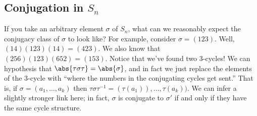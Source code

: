 \subsection{Conjugation in \texorpdfstring{$S_n$}{Sn}}

If you take an arbitrary element $\sigma$ of $S_n$, what can we reasonably expect the conjugacy class of $\sigma$ to look like? For example, consider $\sigma = (123)$. Well, $(14)(123)(14) = (423)$. We also know that $(256)(123)(652) = (153)$. Notice that we've found two $3$-cycles! We can hypothesis that $\abs{\tau \sigma \tau} = \abs{\sigma}$, and in fact we just replace the elements of the $3$-cycle with ``where the numbers in the conjugating cycles get sent.'' That is, if $\sigma = (a_1,\dotsc,a_k)$ then $\tau\sigma\tau^{-1} = (\tau(a_1)),\dotsc,\tau(a_k))$. We can infer a slightly stronger link here; in fact, $\sigma$ is conjugate to $\sigma'$ if and only if they have the same cycle structure.